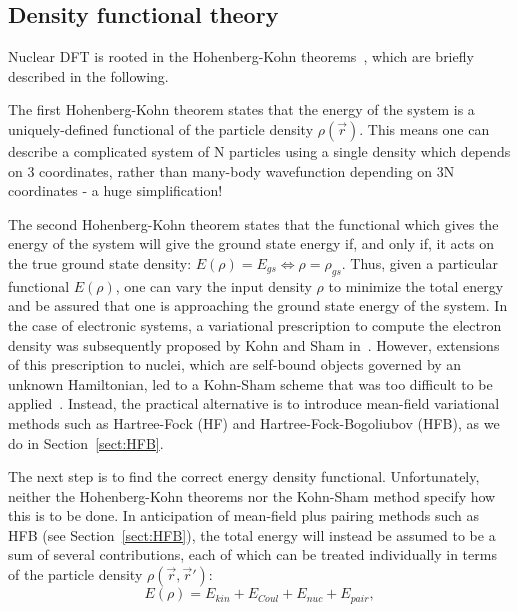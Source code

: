 \subsection{Density functional theory}\label{sect:DFT}
Nuclear DFT is rooted in the Hohenberg-Kohn theorems~\cite{Hohenberg1964}, which are briefly described in the following.

The first Hohenberg-Kohn theorem states that the energy of the system is a uniquely-defined functional of the particle density $\rho(\vec{r})$. This means one can describe a complicated system of N particles using a single density which depends on 3 coordinates, rather than many-body wavefunction depending on 3N coordinates - a huge simplification!

The second Hohenberg-Kohn theorem states that the functional which gives the energy of the system will give the ground state energy if, and only if, it acts on the true ground state density: $E(\rho)=E_{gs} \iff \rho = \rho_{gs}$. Thus, given a particular functional $E(\rho)$, one can vary the input density $\rho$ to minimize the total energy and be assured that one is approaching the ground state energy of the system. In the case of electronic systems, a variational prescription to compute the electron density was subsequently proposed by Kohn and Sham in~\cite{Kohn1965}. However, extensions of this prescription to nuclei, which are self-bound objects governed by an unknown Hamiltonian, led to a Kohn-Sham scheme that was too difficult to be applied~\cite{engel2007,barnea2007,messud2009}. Instead, the practical alternative is to introduce mean-field variational methods such as Hartree-Fock (HF) and Hartree-Fock-Bogoliubov (HFB), as we do in Section~\ref{sect:HFB}.

The next step is to find the correct energy density functional. Unfortunately, neither the Hohenberg-Kohn theorems nor the Kohn-Sham method specify how this is to be done. In anticipation of mean-field plus pairing methods such as HFB (see Section~\ref{sect:HFB}), the total energy will instead be assumed to be a sum of several contributions, each of which can be treated individually in terms of the particle density $\rho(\vec{r},\vec{r}')$:
\begin{equation}\label{eq:EDFterms}
E(\rho) = E_{kin} + E_{Coul} + E_{nuc} + E_{pair},
\end{equation}

